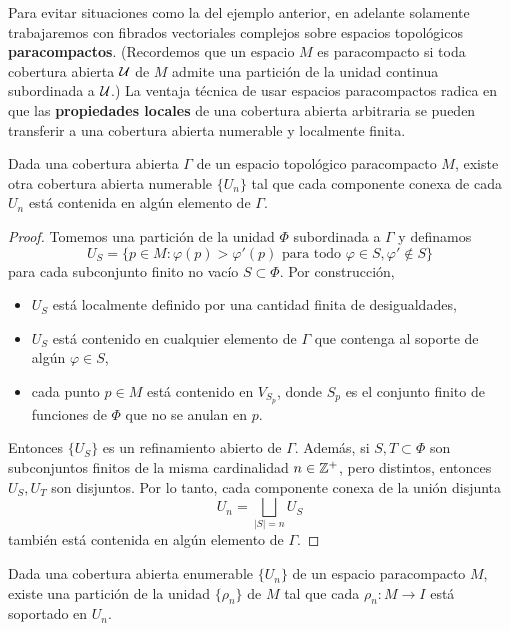 Para evitar situaciones como la del ejemplo anterior, en adelante solamente trabajaremos con fibrados vectoriales complejos sobre espacios topológicos \textbf{paracompactos}. (Recordemos que un espacio $M$ es paracompacto si toda cobertura abierta $\mathcal U$ de $M$ admite una partición de la unidad continua subordinada a $\mathcal U$.) La ventaja técnica de usar espacios paracompactos radica en que las \textbf{propiedades locales} de una cobertura abierta arbitraria se pueden transferir a una cobertura abierta numerable y localmente finita.

\begin{lemma}
Dada una cobertura abierta $\Gamma$ de un espacio topológico paracompacto $M$, existe otra cobertura abierta numerable $\{ U_n \}$ tal que cada componente conexa de cada $U_n$ está contenida en algún elemento de $\Gamma$.
\end{lemma}

\begin{proof}
Tomemos una partición de la unidad $\Phi$ subordinada a $\Gamma$ y definamos
$$U_S = \Big \{ p \in M : \varphi(p) > \varphi'(p) \text{ para todo } \varphi \in S, \varphi' \notin S \Big \}$$
para cada subconjunto finito no vacío $S \subset \Phi$. Por construcción,
\begin{itemize}
    \itemsep 0em
    \item $U_S$ está localmente definido por una cantidad finita de desigualdades,
    \item $U_S$ está contenido en cualquier elemento de $\Gamma$ que contenga al soporte de algún $\varphi \in S$,
    \item cada punto $p \in M$ está contenido en $V_{S_p}$, donde $S_p$ es el conjunto finito de funciones de $\Phi$ que no se anulan en $p$.
\end{itemize}
Entonces $\{ U_S \}$ es un refinamiento abierto de $\Gamma$. Además, si $S, T \subset \Phi$ son subconjuntos finitos de la misma cardinalidad $n \in \mathbb Z^+$, pero distintos, entonces $U_S, U_T$ son disjuntos. Por lo tanto, cada componente conexa de la unión disjunta
$$U_n = \bigsqcup_{|S| = n} U_S$$
también está contenida en algún elemento de $\Gamma$.
\end{proof}

\begin{lemma}
Dada una cobertura abierta enumerable $\{ U_n \}$ de un espacio paracompacto $M$, existe una partición de la unidad $\{ \rho_n \}$ de $M$ tal que cada $\rho_n : M \to I$ está soportado en $U_n$.
\end{lemma}

